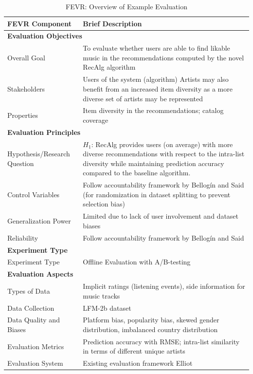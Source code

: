 \documentclass[\myFontSize,oneside,english,hidelinks,a4paper]{article}
\begin{document}
%
%
%
%
%
\begin{table}[h!]
\centering
\caption{FEVR: Overview of Example Evaluation}
\begin{tabular}{lp{10cm}}
\hline
\textbf{FEVR Component} & \textbf{Brief Description} \\ \hline
\multicolumn{2}{|l|}{\textbf{Evaluation Objectives}} \\ \hline
Overall Goal & To evaluate whether users are able to find likable music in the recommendations computed by the novel RecAlg algorithm \\ \hline
Stakeholders & Users of the system (algorithm) \newline Artists may also benefit from an increased item diversity as a more diverse set of artists may be represented \\ \hline
Properties & Item diversity in the recommendations; catalog coverage \\ \hline
\multicolumn{2}{|l|}{\textbf{Evaluation Principles}} \\ \hline
Hypothesis/Research Question & \( H_1 \): RecAlg provides users (on average) with more diverse recommendations with respect to the intra-list diversity while maintaining prediction accuracy compared to the baseline algorithm. \\ \hline
Control Variables & Follow accountability framework by Bellogín and Said \cite{24} (for randomization in dataset splitting to prevent selection bias) \\ \hline
Generalization Power & Limited due to lack of user involvement and dataset biases \\ \hline
Reliability & Follow accountability framework by Bellogín and Said \cite{24} \\ \hline
\multicolumn{2}{|l|}{\textbf{Experiment Type}} \\ \hline
Experiment Type & Offline Evaluation with A/B-testing \\ \hline
\multicolumn{2}{|l|}{\textbf{Evaluation Aspects}} \\ \hline
Types of Data & Implicit ratings (listening events), side information for music tracks \\ \hline
Data Collection & LFM-2b dataset \cite{194} \\ \hline
Data Quality and Biases & Platform bias, popularity bias, skewed gender distribution, imbalanced country distribution \\ \hline
Evaluation Metrics & Prediction accuracy with RMSE; intra-list similarity in terms of different unique artists \\ \hline
Evaluation System & Existing evaluation framework Elliot \cite{14} \\ \hline
\end{tabular}
\end{table}
\end{document}
